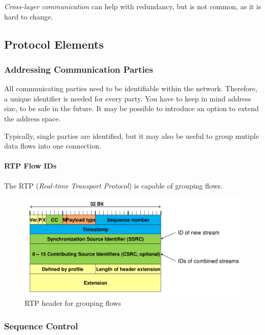 \documentclass[english]{panikzettel}
\begin{document}
	\textit{Cross-layer communication} can help with redundancy, but is not common, as it is hard to change. 

	\subsection{Protocol Elements}
	\label{ss-protocol-elements}
	
	\subsubsection{Addressing Communication Parties}
	\label{sss-addressing-communication-parties}
	
	All communicating parties need to be identifiable within the network. 
	Therefore, a unique identifier is needed for every party.
	You have to keep in mind address size, to be safe in the future.
	It may be possible to introduce an option to extend the address space.
	
	Typically, single parties are identified, but it may also be useful to group mutiple data flows into one connection.

	\paragraph{RTP Flow IDs}
	\label{pgf-rtp-flow-ids}
	
	The RTP (\textit{Real-time Transport Protocol}) is capable of grouping flows.

	\begin{figure}[H]
		\centering
		\includegraphics[width=\textwidth]{img/2-rtp-flow-ids.png}
		\caption{RTP header for grouping flows}
		\label{img-2-rtp-flow-ids}
	\end{figure}

	\subsubsection{Sequence Control}
	\label{sssec-sequence-control}
	
\end{document}
